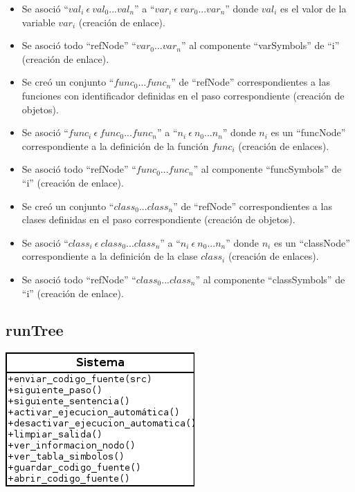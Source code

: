\begin{framed}
\begin{description}
\begin {itemize}
         \item Se asoció ``$val_i\ \epsilon\ val_0...val_n$'' a  ``$var_i\ \epsilon\ var_0...var_n$'' donde $val_i$ es el valor de la variable $var_i$ (creación de enlace). 
         \item Se asoció todo ``refNode'' ``$var_0...var_n$'' al componente ``varSymbols'' de ``i'' (creación de enlace). 
         \item Se creó un conjunto ``$func_0...func_n$'' de ``refNode'' correspondientes a las funciones con identificador definidas en el paso correspondiente (creación de objetos).
         \item Se asoció ``$func_i\ \epsilon\ func_0...func_n$'' a  ``$n_i\ \epsilon\ n_0...n_n$'' donde $n_i$ es un ``funcNode'' correspondiente a la definición de la función $func_i$ (creación de enlaces).
         \item Se asoció todo ``refNode'' ``$func_0...func_n$'' al componente ``funcSymbols'' de ``i'' (creación de enlace). 
         \item Se creó un conjunto ``$class_0...class_n$'' de ``refNode'' correspondientes a las clases definidas en el paso correspondiente (creación de objetos).
         \item Se asoció ``$class_i\ \epsilon\ class_0...class_n$'' a  ``$n_i\ \epsilon\ n_0...n_n$'' donde $n_i$ es un ``classNode'' correspondiente a la definición de la clase $class_i$ (creación de enlaces).
         \item Se asoció todo ``refNode'' ``$class_0...class_n$'' al componente ``classSymbols'' de ``i'' (creación de enlace). 
      \end{itemize}
	\end{description}
\end{framed}
\FloatBarrier
\subsection{runTree}
\begin{center}
\includegraphics[scale=0.7]{operaciones_sistema_runtree.png} \\
\end{center}
